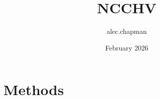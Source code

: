 \documentclass{article}
\title{NCCHV}
\author{alec.chapman }
\date{February 2026}
\begin{document}
\maketitle



\section{Methods}

\end{document}
